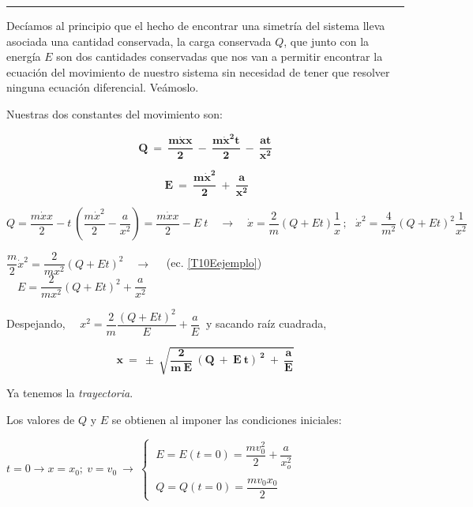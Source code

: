 \vspace{5mm}
\begin{center}
\rule{300pt}{0.1pt}	
\end{center}

\vspace{5mm} 
Decíamos al principio que el hecho de encontrar una simetría del sistema lleva asociada una cantidad conservada, la carga conservada $Q$, que junto con la energía $E$ son dos cantidades conservadas que nos van a permitir encontrar la ecuación del movimiento de nuestro sistema sin necesidad de tener que resolver ninguna ecuación diferencial. Veámoslo.

Nuestras dos constantes del movimiento son:

\begin{multicols}{2}
\begin{equation}
\boxed{ \ \boldsymbol{ Q \ = \ 	\dfrac{m\dot x x}{2} \ - \ \dfrac{m\dot x^2 t}{2} \ - \ \dfrac{at}{x^2}} \ } 
\end{equation}

\begin{equation}
\label{T10Eejemplo}
\boxed{ \ \boldsymbol{E \ = \ \dfrac {m\dot x^2}{2} \ + \ \dfrac{a}{x^2} } } 
\end{equation}	
\end{multicols}


$Q  = \dfrac{m\dot x x}{2} - t\ \left(\dfrac{m\dot x^2 }{2} - \dfrac{a}{x^2} \right) = \dfrac{m\dot x x}{2} - E\ t \quad \to \quad \dot x=\dfrac 2 m  \left( Q+Et \right)  \dfrac 1 x\, ; \ \ \  \dot x^2=\dfrac 4{m^2} (Q+Et)^2 \dfrac 1{x^2}$

$\dfrac m 2 \dot x^2 = \dfrac{2}{mx^2} (Q+Et)^2 \quad \to \quad $ (ec. \ref{T10Eejemplo}) $\quad E=\dfrac{2}{mx^2} (Q+Et)^2+\dfrac {a}{x^2}$

Despejando, $\quad x^2=\dfrac 2 m \dfrac{(Q+Et)^2}{E} + \dfrac a E\ $
 y sacando raíz cuadrada,
 
\begin{equation} 
\boxed{ \ \boldsymbol{
x \ = \ \pm \ \sqrt{\dfrac 2 {m\ E} \ (Q\ + \ E \ t)^{\ 2} \ + \ \dfrac a E}	
} \ }
\end{equation}

Ya tenemos la \emph{trayectoria}. 

\textcolor{gris}{Los valores de $Q$ y $E$ se obtienen al imponer las condiciones iniciales:}

\textcolor{gris}{$t=0 \to x=x_0;\ v=v_0 \ \to \ \begin{cases}
 \ E=E(t=0)=\dfrac{mv_0^2}{2}+\dfrac{a}{x_o^2} \\ \\ \ Q=Q(t=0)=\dfrac{mv_0x_0}{2} \end{cases}$}
 
 
 

